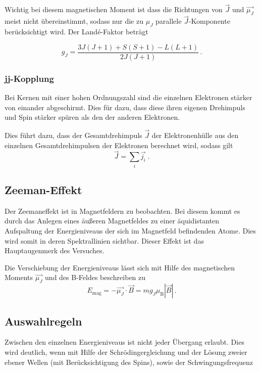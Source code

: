 \noindent
Wichtig bei diesem magnetischen Moment ist dass die Richtungen von $\vec{J}$ und $\vec{\mu_J}$ meist nicht übereinstimmt, sodass
nur die zu $\mu_J$ parallele $\vec{J}$-Komponente berücksichtigt wird. Der Landé-Faktor beträgt 

\begin{equation}
    g_J = \frac{3J(J+1) + S(S+1) - L(L+1)}{2J(J+1)}\, .
    \label{eqn:lande}
\end{equation}


\subsubsection{jj-Kopplung}

Bei Kernen mit einer hohen Ordnungszahl sind die einzelnen Elektronen stärker von einander abgeschirmt. Dies für dazu, dass diese ihren eigenen Drehimpuls und Spin stärker 
spüren als den der anderen Elektronen. 

\noindent
Dies führt dazu, dass der Gesamtdrehimpuls $\vec{J}$ der Elektronenhülle aus den einzelnen Gesamtdrehimpulsen der Elektronen berechnet wird, sodass gilt
\begin{equation}
    \vec{J} = \sum_i \vec{j_i} \; .
\end{equation}



\subsection{Zeeman-Effekt}
Der Zeemaneffekt ist in Magnetfeldern zu beobachten. Bei diesem kommt es durch das Anlegen eines äußeren Magnetfeldes zu einer äquidistanten Aufspaltung der Energieniveaus der sich im
Magnetfeld befindenden Atome. Dies wird somit in deren Spektrallinien sichtbar. Dieser Effekt ist das Hauptaugenmerk des Versuches.

\noindent
Die Verschiebung der Energieniveaus lässt sich mit Hilfe des magnetischen Moments $\vec{\mu_J}$ und des B-Feldes beschreiben zu 
\begin{equation}
    E_\text{mag} = - \vec{\mu_J} \cdot \vec{B} = m g_J \mu_\text{B} |\vec{B}| \, .
    \label{eqn:energie}
\end{equation} 

\subsection{Auswahlregeln}
Zwischen den einzelnen Energieniveaus ist nicht jeder Übergang erlaubt. Dies wird deutlich, wenn mit Hilfe der Schrödingergleichung und der Lösung zweier ebener Wellen (mit Berücksichtigung
des Spins), sowie der Schwingungsfrequenz

